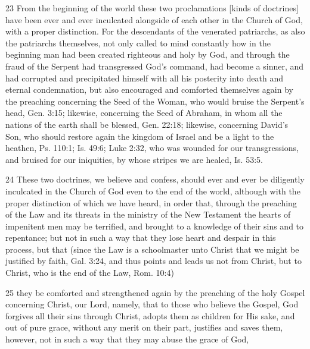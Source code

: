 23 From the beginning of the world these two proclamations [kinds of doctrines] have been ever and ever inculcated alongside of each other in the Church of God, with a proper distinction. For the descendants of the venerated patriarchs, as also the patriarchs themselves, not only called to mind constantly how in the beginning man had been created righteous and holy by God, and through the fraud of the Serpent had transgressed God’s command, had become a sinner, and had corrupted and precipitated himself with all his posterity into death and eternal condemnation, but also encouraged and comforted themselves again by the preaching concerning the Seed of the Woman, who would bruise the Serpent’s head, Gen. 3:15; likewise, concerning the Seed of Abraham, in whom all the nations of the earth shall be blessed, Gen. 22:18; likewise, concerning David’s Son, who should restore again the kingdom of Israel and be a light to the heathen, Ps. 110:1; Is. 49:6; Luke 2:32, who was wounded for our transgressions, and bruised for our iniquities, by whose stripes we are healed, Is. 53:5.

24 These two doctrines, we believe and confess, should ever and ever be diligently inculcated in the Church of God even to the end of the world, although with the proper distinction of which we have heard, in order that, through the preaching of the Law and its threats in the ministry of the New Testament the hearts of impenitent men may be terrified, and brought to a knowledge of their sins and to repentance; but not in such a way that they lose heart and despair in this process, but that (since the Law is a schoolmaster unto Christ that we might be justified by faith, Gal. 3:24, and thus points and leads us not from Christ, but to Christ, who is the end of the Law, Rom. 10:4)

25 they be comforted and strengthened again by the preaching of the holy Gospel concerning Christ, our Lord, namely, that to those who believe the Gospel, God forgives all their sins through Christ, adopts them as children for His sake, and out of pure grace, without any merit on their part, justifies and saves them, however, not in such a way that they may abuse the grace of God,

